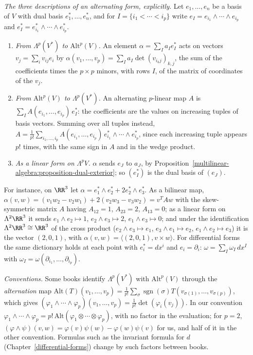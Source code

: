 \begin{example}\label{multilinear-algebra:example-forms-dictionary}
\emph{The three descriptions of an alternating form, explicitly.} Let $e_1, \ldots, e_n$ be a basis of $V$ with dual basis $e_1^*, \ldots, e_n^*$, and for $I = \{i_1 < \cdots < i_p\}$ write
$e_I = e_{i_1} \wedge \cdots \wedge e_{i_p}$ and $e_I^* = e_{i_1}^* \wedge \cdots \wedge e_{i_p}^*$.
\begin{enumerate}
\item \emph{From $\Lambda^p(V^*)$ to $\mathrm{Alt}^p(V)$.} An element $\alpha = \sum_Ia_Ie_I^*$ acts on vectors $v_j = \sum_iv_{ij}e_i$ by
$\alpha(v_1, \ldots, v_p) = \sum_Ia_I\det(v_{i_kj})_{k,j}$, the sum of the coefficients times the $p \times p$ minors, with rows $I$, of the matrix of coordinates of the $v_j$.
\item \emph{From $\mathrm{Alt}^p(V)$ to $\Lambda^p(V^*)$.} An alternating $p$-linear map $A$ is $\sum_IA(e_{i_1}, \ldots, e_{i_p})\,e_I^*$: the coefficients are the values on increasing tuples of basis vectors.
Summing over all tuples instead, $A = \frac1{p!}\sum_{i_1, \ldots, i_p}A(e_{i_1}, \ldots, e_{i_p})\,e_{i_1}^* \wedge \cdots \wedge e_{i_p}^*$, since each increasing tuple appears $p!$ times, with the same
sign in $A$ and in the wedge product.
\item \emph{As a linear form on $\Lambda^pV$.} $\alpha$ sends $e_J$ to $a_J$, by Proposition~\ref{multilinear-algebra:proposition-dual-exterior}; so $(e_I^*)$ is the dual basis of $(e_J)$.
\end{enumerate}
For instance, on $\RR^3$ let $\alpha = e_1^* \wedge e_2^* + 2e_2^* \wedge e_3^*$. As a bilinear map, $\alpha(v, w) = (v_1w_2 - v_2w_1) + 2(v_2w_3 - v_3w_2) = v^TAw$ with the skew-symmetric matrix $A$ having
$A_{12} = 1$, $A_{23} = 2$, $A_{13} = 0$; as a linear form on $\Lambda^2\RR^3$ it sends $e_1 \wedge e_2 \mapsto 1$, $e_2 \wedge e_3 \mapsto 2$, $e_1 \wedge e_3 \mapsto 0$; and under the identification
$\Lambda^2\RR^3 \cong \RR^3$ of the cross product ($e_2 \wedge e_3 \mapsto e_1$, $e_3 \wedge e_1 \mapsto e_2$, $e_1 \wedge e_2 \mapsto e_3$) it is the vector $(2, 0, 1)$, with
$\alpha(v, w) = \langle(2, 0, 1), v \times w\rangle$. For differential forms the same dictionary holds at each point with $e_i^* = dx^i$ and $e_i = \partial_i$: $\omega = \sum_I\omega_I\,dx^I$ with
$\omega_I = \omega(\partial_{i_1}, \ldots, \partial_{i_p})$.

\emph{Conventions.} Some books identify $\Lambda^p(V^*)$ with $\mathrm{Alt}^p(V)$ through the \emph{alternation} map $\mathrm{Alt}(T)(v_1, \ldots, v_p) = \frac1{p!}\sum_\sigma\operatorname{sgn}(\sigma)T(v_{\sigma(1)}, \ldots, v_{\sigma(p)})$,
which gives $(\varphi_1 \wedge \cdots \wedge \varphi_p)(v_1, \ldots, v_p) = \frac1{p!}\det(\varphi_i(v_j))$. In our convention $\varphi_1 \wedge \cdots \wedge \varphi_p = p!\,\mathrm{Alt}(\varphi_1 \otimes \cdots \otimes \varphi_p)$,
with no factor in the evaluation; for $p = 2$, $(\varphi \wedge \psi)(v, w) = \varphi(v)\psi(w) - \varphi(w)\psi(v)$ for us, and half of it in the other convention. Formulas such as the invariant formula for $d$
(Chapter~\ref{differential-forms}) change by such factors between books.
\end{example}

